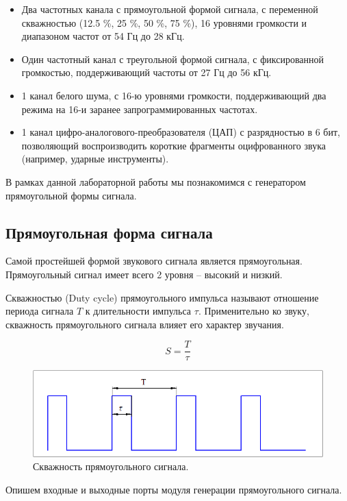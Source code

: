 \begin{itemize}
	\item Два частотных канала с прямоугольной формой сигнала, с переменной скважностью (12.5 \%, 25 \%, 50 \%, 75 \%), 16 уровнями громкости и диапазоном частот от 54 Гц до 28 кГц.
	\item Один частотный канал с треугольной формой сигнала, с фиксированной громкостью, поддерживающий частоты от 27 Гц до 56 кГц.
	\item 1 канал белого шума, с 16-ю уровнями громкости, поддерживающий два режима на 16-и заранее запрограммированных частотах. 
	\item 1 канал цифро-аналогового-преобразователя (ЦАП) с разрядностью в 6 бит, позволяющий воспроизводить короткие фрагменты оцифрованного звука (например, ударные инструменты).

\end{itemize}

В рамках данной лабораторной работы мы познакомимся с генератором прямоугольной формы сигнала.

\subsection{Прямоугольная форма сигнала}

Самой простейшей формой звукового сигнала является прямоугольная. Прямоугольный сигнал имеет всего 2 уровня -- высокий и низкий. 


Скважностью (Duty cycle) прямоугольного импульса называют отношение периода сигнала $T$ к длительности импульса $\tau$. Применительно ко звуку, скважность прямоугольного сигнала влияет его характер звучания.

$$ S = \frac{T}{\tau} $$


\begin{figure}[H]
	\centering
	\includegraphics [width=1\textwidth] {images/lab_7/duty_cycle.png}
	\caption{Скважность прямоугольного сигнала.}
	\label{lab7:pic4}
\end{figure}


Опишем входные и выходные порты модуля генерации прямоугольного сигнала.

